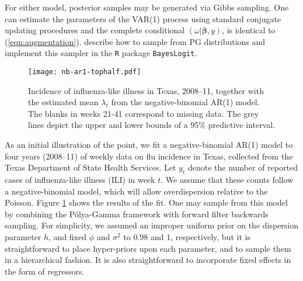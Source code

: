 \documentclass[11pt]{article}
\newcommand{\Polya}{P\'{o}lya}
\newcommand{\PG}{\text{PG}}
\newcommand{\bbeta}{\boldsymbol{\beta}}
\begin{document}
For either model, posterior samples may be generated via Gibbs sampling.  One
can estimate the parameters of the VAR(1) process using standard conjugate
updating procedures and the complete conditional $(\omega | \bbeta, y)$, is
identical to (\ref{eqn:augmentation}).  \cite{polson-etal-2012} describe how to
sample from $\PG$ distributions and implement this sampler in the \texttt{R}
package \texttt{BayesLogit}.  



\begin{figure}
\begin{center}
\texttt{[image: nb-ar1-tophalf.pdf]}
\caption{\label{fig:nb-ar1} Incidence of influenza-like illness in Texas,
  2008--11, together with the estimated mean $\lambda_t$ from the
  negative-binomial AR(1) model.  The blanks in weeks 21-41 correspond to
  missing data.  The grey lines depict the upper and lower bounds of a 95$\%$
  predictive interval.}
\end{center}
\end{figure}

As an initial illustration of the point, we fit a negative-binomial AR(1) model
to four years (2008--11) of weekly data on flu incidence in Texas, collected
from the Texas Department of State Health Services.  Let $y_t$ denote the number
of reported cases of influenza-like illness (ILI) in week $t$.  We assume that
these counts follow a negative-binomial model, which will allow overdispersion
relative to the Poisson.
Figure \ref{fig:nb-ar1} shows the results of the fit.  One may sample from this
model by combining the \Polya-Gamma framework with forward filter backwards
sampling.  For simplicity, we assumed an improper uniform prior on the
dispersion parameter $h$, and fixed $\phi$ and $\sigma^2$ to $0.98$ and 1,
respectively, but it is straightforward to place hyper-priors upon each
parameter, and to sample them in a hierarchical fashion.  It is also
straightforward to incorporate fixed effects in the form of regressors.
\end{document}
